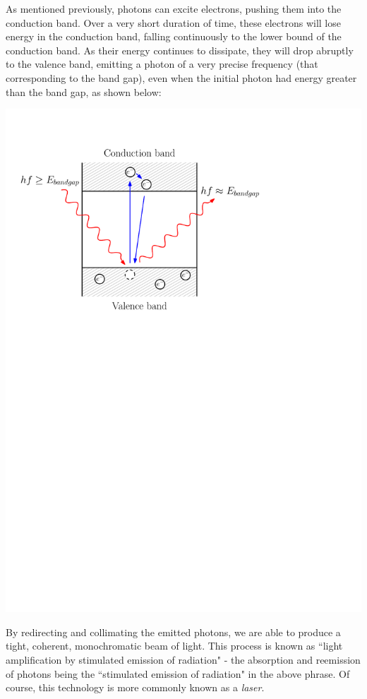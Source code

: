 \documentclass[letterpaper]{article}
\theoremstyle{remark}
\begin{document}
As mentioned previously, photons can excite electrons, pushing them into the conduction band. Over a very short duration of time, these electrons will lose energy in the conduction band, falling continuously to the lower bound of the conduction band. As their energy continues to dissipate, they will drop abruptly to the valence band, emitting a photon of a very precise frequency (that corresponding to the band gap), even when the initial photon had energy greater than the band gap, as shown below:
\begin{center}
    \includegraphics[scale=0.7]{si_photon_absorption_emission.pdf}
\end{center}

By redirecting and collimating the emitted photons, we are able to produce a tight, coherent, monochromatic beam of light. This process is known as ``light amplification by stimulated emission of radiation" - the absorption and reemission of photons being the ``stimulated emission of radiation" in the above phrase. Of course, this technology is more commonly known as a \emph{laser}.
\end{document}
